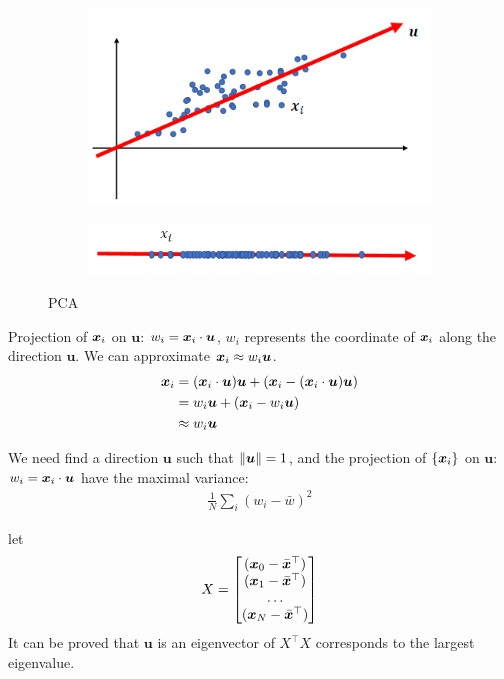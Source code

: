 \begin{figure}[!htb]
    \centering
    \begin{subfigure}{0.618\linewidth}
        \centering
        \includegraphics[width=\linewidth]{pic/1056/PCA}
    \end{subfigure}
    \begin{subfigure}{0.618\linewidth}
        \centering
        \includegraphics[width=\linewidth]{pic/1056/Projection }
    \end{subfigure}
    \caption{PCA}
\end{figure}


Projection of ${\bm{x}}_i$ on $\bm u$: $w_i={\bm{x}}_i\cdot \bm u$, $w_i$ represents the coordinate of ${\bm{x}}_i$ along the direction $\bm{u}$. We can approximate ${\bm{x}}_i\approx w_i \bm u$. 
\begin{align*}
    {\bm{x}}_i&= ({\bm{x}}_i\cdot \bm u)\bm u + ({\bm{x}}_i - ({\bm{x}}_i\cdot \bm u)\bm u)\\
    &= w_i\bm u + ({\bm{x}}_i - w_i\bm u)\\
    &\approx w_i\bm u 
\end{align*}

We need find a direction $\bm u$ such that $\left\lVert\bm u\right\rVert=1$, and the projection of $\{ {\bm{x}}_i \}$ on $\bm u$: $w_i={\bm{x}}_i\cdot \bm u$ have the maximal variance:
\begin{align*}
    \frac{1}{N}\sum_i(w_i-\bar{w})^2
\end{align*}

let
\begin{align*}
    X=\begin{bmatrix}
        ({\bm{x}}_0-\bar{{\bm{x}}}^\top)\\
        ({\bm{x}}_1-\bar{{\bm{x}}}^\top)\\
        \dots\\
        ({\bm{x}}_N-\bar{{\bm{x}}}^\top)\\
    \end{bmatrix}
\end{align*}
It can be proved that $\bm u$ is an eigenvector of $X^\top X$ corresponds to the largest eigenvalue. 

